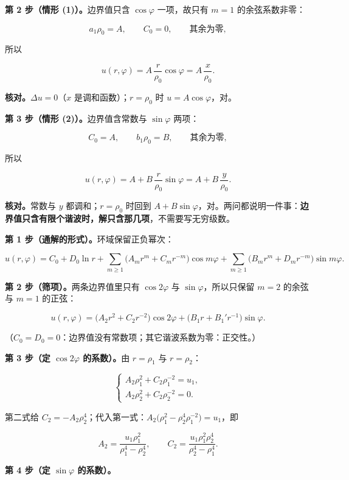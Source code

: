 \documentclass[11pt]{ctexart}
\begin{document}
\textbf{第 2 步（情形 (1)）。}边界值只含 $\cos\varphi$ 一项，故只有 $m=1$ 的余弦系数非零：

\[
a_1\rho_0=A,\qquad C_0=0,\qquad \text{其余为零},
\]

所以

\[
u(r,\varphi)=A\,\frac{r}{\rho_0}\cos\varphi=A\,\frac{x}{\rho_0}.
\]

\textbf{核对。}$\Delta u=0$（$x$ 是调和函数）；$r=\rho_0$ 时 $u=A\cos\varphi$，对。

\textbf{第 3 步（情形 (2)）。}边界值含常数与 $\sin\varphi$ 两项：

\[
C_0=A,\qquad b_1\rho_0=B,\qquad \text{其余为零},
\]

所以

\[
u(r,\varphi)=A+B\,\frac{r}{\rho_0}\sin\varphi=A+B\,\frac{y}{\rho_0}.
\]

\textbf{核对。}常数与 $y$ 都调和；$r=\rho_0$ 时回到 $A+B\sin\varphi$，对。两问都说明一件事：\textbf{边界值只含有限个谐波时，解只含那几项}，不需要写无穷级数。


\textbf{第 1 步（通解的形式）。}环域保留正负幂次：

\[
u(r,\varphi)=C_0+D_0\ln r+\sum_{m\ge1}\big(A_mr^m+C_mr^{-m}\big)\cos m\varphi+\sum_{m\ge1}\big(B_mr^m+D_mr^{-m}\big)\sin m\varphi .
\]

\textbf{第 2 步（筛项）。}两条边界值里只有 $\cos2\varphi$ 与 $\sin\varphi$，所以只保留 $m=2$ 的余弦与 $m=1$ 的正弦：

\[
u(r,\varphi)=\big(A_2r^2+C_2r^{-2}\big)\cos2\varphi+\big(B_1r+B_1'r^{-1}\big)\sin\varphi .
\]

（$C_0=D_0=0$：边界值没有常数项；其它谐波系数为零：正交性。）

\textbf{第 3 步（定 $\cos2\varphi$ 的系数）。}由 $r=\rho_1$ 与 $r=\rho_2$：

\[
\begin{cases}
A_2\rho_1^2+C_2\rho_1^{-2}=u_1,\\[2pt]
A_2\rho_2^2+C_2\rho_2^{-2}=0 .
\end{cases}
\]

第二式给 $C_2=-A_2\rho_2^4$；代入第一式：$A_2\big(\rho_1^2-\rho_2^4\rho_1^{-2}\big)=u_1$，即

\[
A_2=\frac{u_1\rho_1^2}{\rho_1^4-\rho_2^4},\qquad C_2=\frac{u_1\rho_1^2\rho_2^4}{\rho_2^4-\rho_1^4}.
\]

\textbf{第 4 步（定 $\sin\varphi$ 的系数）。}
\end{document}
